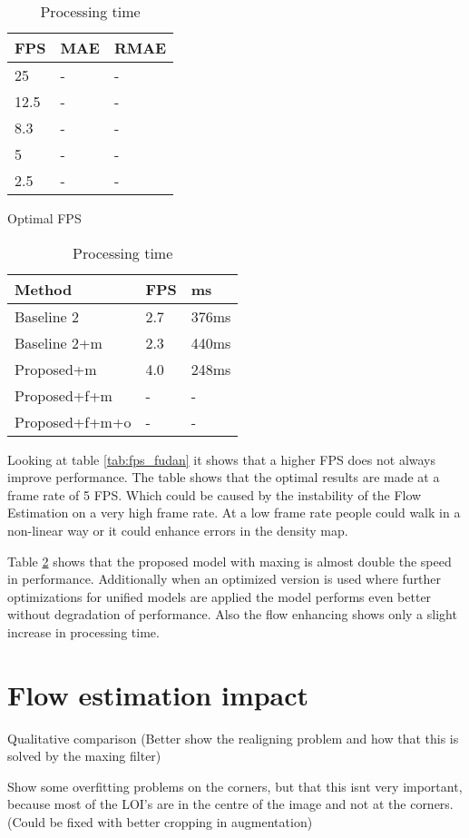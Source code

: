 \begin{table}[!htb]
\begin{minipage}{.5\linewidth}
\centering
\begin{tabular}{lll}
		\hline
		FPS                               & MAE & RMAE \\ \hline
		\multicolumn{1}{l|}{25}          & - & - \\
		\multicolumn{1}{l|}{12.5}        & - & - \\
		\multicolumn{1}{l|}{8.3}        & - & - \\
		\multicolumn{1}{l|}{5}        & - & - \\
		\multicolumn{1}{l|}{2.5} & - & - \\ \hline
		\end{tabular}
\caption{\label{tab:fps_fudan} Optimal FPS}
\end{minipage}
\begin{minipage}{.5\linewidth}
\centering
\begin{tabular}{lll}
\hline
Method                             & FPS & ms \\ \hline
\multicolumn{1}{l|}{Baseline 2}    & 2.7 & 376ms \\
\multicolumn{1}{l|}{Baseline 2+m} & 2.3 & 440ms \\
\multicolumn{1}{l|}{Proposed+m}      & 4.0 & 248ms \\
\multicolumn{1}{l|}{Proposed+f+m} &- & -\\
\multicolumn{1}{l|}{Proposed+f+m+o} & - & - \\ \hline
\end{tabular}
\caption{\label{tab:processing_fudan}Processing time}
\end{minipage} %
\end{table}

Looking at table \ref{tab:fps_fudan} it shows that a higher FPS does not always improve performance. The table shows that the optimal results are made at a frame rate of 5 FPS. Which could be caused by the instability of the Flow Estimation on a very high frame rate. At a low frame rate people could walk in a non-linear way or it could enhance errors in the density map.

Table \ref{tab:processing_fudan} shows that the proposed model with maxing is almost double the speed in performance. Additionally when an optimized version is used where further optimizations for unified models are applied the model performs even better without degradation of performance. Also the flow enhancing shows only a slight increase in processing time.



\section{Flow estimation impact}
Qualitative comparison (Better show the realigning problem and how that this is solved by the maxing filter)

Show some overfitting problems on the corners, but that this isnt very important, because most of the LOI's are in the centre of the image and not at the corners. (Could be fixed with better cropping in augmentation)